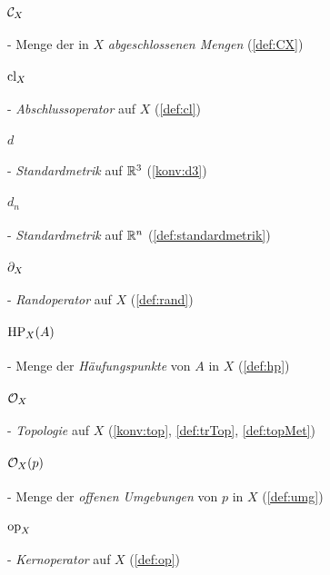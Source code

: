     \paragraph{$\mathcal{C}_X$} - \quad Menge der in $X$ \textit{abgeschlossenen Mengen} (\ref{def:CX})

    \paragraph{$\text{cl}_X$} - \quad \textit{Abschlussoperator} auf $X$ (\ref{def:cl})

    \paragraph{$d$} - \quad \textit{Standardmetrik} auf $\mathbb{R}^3$ (\ref{konv:d3})
    
    \paragraph{$d_n$} - \quad \textit{Standardmetrik} auf $\mathbb{R}^n$ (\ref{def:standardmetrik})
    
    \paragraph{$\partial_X$} - \quad \textit{Randoperator} auf $X$ (\ref{def:rand})

    \paragraph{$\text{HP}_X(A)$} - \quad Menge der \textit{Häufungspunkte} von $A$ in $X$ (\ref{def:hp})
 
    \paragraph{$\mathcal{O}_X$} - \quad \textit{Topologie} auf $X$ (\ref{konv:top}, \ref{def:trTop}, \ref{def:topMet})

    \paragraph{$\mathcal{O}_X(p)$} - \quad Menge der \textit{offenen Umgebungen} von $p$ in $X$ (\ref{def:umg})

    \paragraph{$\text{op}_X$} - \quad \textit{Kernoperator} auf $X$ (\ref{def:op})




